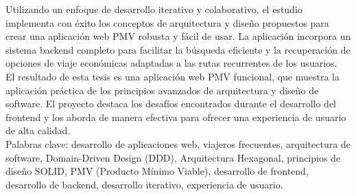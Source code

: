 \documentclass[a4paper, 11pt, oneside]{book}
\begin{document}
Utilizando un enfoque de desarrollo iterativo y colaborativo, el estudio
implementa con éxito los conceptos de arquitectura y diseño propuestos para
crear una aplicación web PMV robusta y fácil de usar. La aplicación incorpora un
sistema backend completo para facilitar la búsqueda eficiente y la recuperación
de opciones de viaje económicas adaptadas a las rutas recurrentes de los
usuarios.
\\[8pt]
El resultado de esta tesis es una aplicación web PMV funcional, que muestra la
aplicación práctica de los principios avanzados de arquitectura y diseño de
software. El proyecto destaca los desafíos encontrados durante el desarrollo del
frontend y los aborda de manera efectiva para ofrecer una experiencia de usuario
de alta calidad.
\\[16pt]
Palabras clave: desarrollo de aplicaciones web, viajeros frecuentes,
arquitectura de software, Domain-Driven Design (DDD), Arquitectura Hexagonal,
principios de diseño SOLID, PMV (Producto Mínimo Viable), desarrollo de
frontend, desarrollo de backend, desarrollo iterativo, experiencia de usuario.
\end{document}
